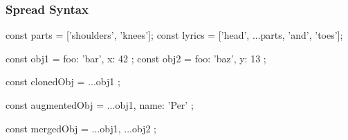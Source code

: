 \begin{frame}[fragile] \frametitle{Spread Syntax}
\begin{CodeBox}{}
const parts = ['shoulders', 'knees']; 
const lyrics = ['head', ...parts, 'and', 'toes']; 

const obj1 = { foo: 'bar', x: 42 };
const obj2 = { foo: 'baz', y: 13 };

const clonedObj = { ...obj1 };

const augmentedObj = { ...obj1, name: 'Per' };

const mergedObj = { ...obj1, ...obj2 };

\end{CodeBox}
\end{frame}

